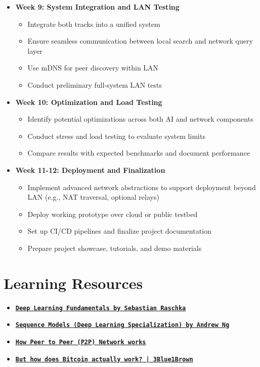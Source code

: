 \documentclass[11pt,a4paper]{article}
\begin{document}
\begin{itemize}
    \item \textbf{Week 9: System Integration and LAN Testing}
    \begin{itemize}
        \item Integrate both tracks into a unified system
        \item Ensure seamless communication between local search and network query layer
        \item Use mDNS for peer discovery within LAN
        \item Conduct preliminary full-system LAN tests
    \end{itemize}

    \item \textbf{Week 10: Optimization and Load Testing}
    \begin{itemize}
        \item Identify potential optimizations across both AI and network components
        \item Conduct stress and load testing to evaluate system limits
        \item Compare results with expected benchmarks and document performance
    \end{itemize}

    \item \textbf{Week 11-12: Deployment and Finalization}
    \begin{itemize}
        \item Implement advanced network abstractions to support deployment beyond LAN (e.g., NAT traversal, optional relays)
        \item Deploy working prototype over cloud or public testbed
        \item Set up CI/CD pipelines and finalize project documentation
        \item Prepare project showcase, tutorials, and demo materials
    \end{itemize}
\end{itemize}

\hfill
\section{Learning Resources}
\begin{itemize}
    \item \href{https://sebastianraschka.com/blog/2021/dl-course.html}{\underline{\texttt{\textbf{Deep Learning Fundamentals by Sebastian Raschka}}}}
    \item \href{https://www.coursera.org/learn/nlp-sequence-models}{\underline{\texttt{\textbf{Sequence Models (Deep Learning Specialization) by Andrew Ng}}}}
    \item \href{https://www.youtube.com/watch?v=2v6KqRB7adg&t=3s&pp=ygUMcGVlciB0byBwZWVy}{\underline{\texttt{\textbf{How Peer to Peer (P2P) Network works}}}}
     \item \href{https://www.youtube.com/watch?v=bBC-nXj3Ng4&t=1s&pp=ygURaG93IGJpdGNvaW4gd29ya3M%3D}{\underline{\texttt{\textbf{But how does Bitcoin actually work? | 3Blue1Brown}}}}
    
\end{itemize}
\end{document}
